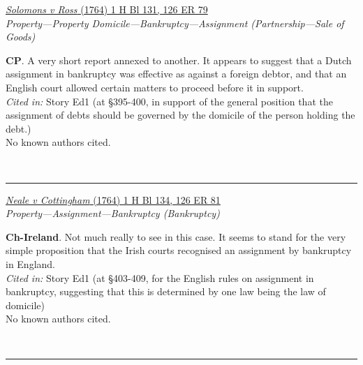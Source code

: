 \documentclass[twoside]{article}
\begin{document}
        \begin{small}
        \begin{center}
        \href{https://heinonline.org/HOL/P?h=hein.engrep/engrg0126&i=83}{\textit{Solomons v Ross} (1764) 1 H Bl 131, 126 ER 79} \label{124} \\ 
\textit{Property---Property Domicile---Bankruptcy---Assignment (Partnership---Sale of Goods)}\\
        \end{center}
        \textbf{CP}. A very short report annexed to another. It appears to suggest that a Dutch assignment in bankruptcy was effective as against a foreign debtor, and that an English court allowed certain matters to proceed before it in support.\\\textit{Cited in: }Story Ed1 (at §395-400, in support of the general position that the assignment of debts should be governed by the domicile of the person holding the debt.)\\No known authors cited.
        \end{small}\\
        \rule{\textwidth}{0.5pt}
        

        \begin{small}
        \begin{center}
        \href{https://heinonline.org/HOL/P?h=hein.engrep/engrg0126&i=85}{\textit{Neale v Cottingham} (1764) 1 H Bl 134, 126 ER 81} \label{131} \\ 
\textit{Property---Assignment---Bankruptcy (Bankruptcy)}\\
        \end{center}
        \textbf{Ch-Ireland}. Not much really to see in this case. It seems to stand for the very simple proposition that the Irish courts recognised an assignment by bankruptcy in England.\\\textit{Cited in: }Story Ed1 (at §403-409, for the English rules on assignment in bankruptcy, suggesting that this is determined by one law being the law of domicile)\\No known authors cited.
        \end{small}\\
        \rule{\textwidth}{0.5pt}
        
\end{document}
